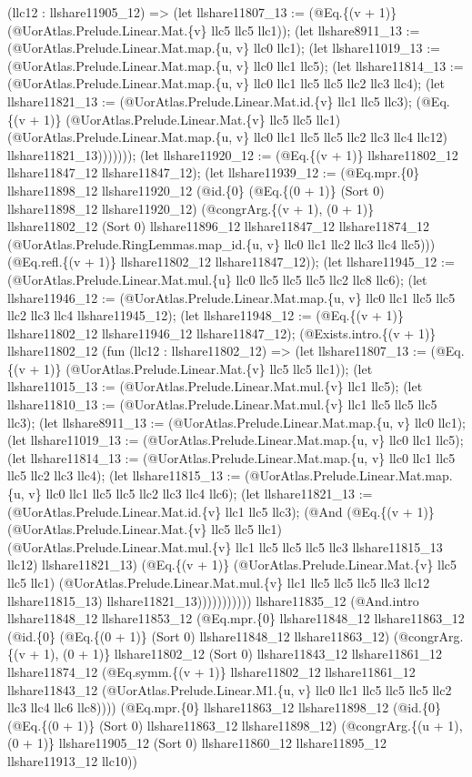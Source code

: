 \documentclass[11pt]{article}
\begin{document}
(llc12 : llshare11905\_12) => (let llshare11807\_13 := (@Eq.\{(v + 1)\} (@UorAtlas.Prelude.Linear.Mat.\{v\} llc5 llc5 llc1)); (let llshare8911\_13 := (@UorAtlas.Prelude.Linear.Mat.map.\{u, v\} llc0 llc1); (let llshare11019\_13 := (@UorAtlas.Prelude.Linear.Mat.map.\{u, v\} llc0 llc1 llc5); (let llshare11814\_13 := (@UorAtlas.Prelude.Linear.Mat.map.\{u, v\} llc0 llc1 llc5 llc5 llc2 llc3 llc4); (let llshare11821\_13 := (@UorAtlas.Prelude.Linear.Mat.id.\{v\} llc1 llc5 llc3); (@Eq.\{(v + 1)\} (@UorAtlas.Prelude.Linear.Mat.\{v\} llc5 llc5 llc1) (@UorAtlas.Prelude.Linear.Mat.map.\{u, v\} llc0 llc1 llc5 llc5 llc2 llc3 llc4 llc12) llshare11821\_13))))))); (let llshare11920\_12 := (@Eq.\{(v + 1)\} llshare11802\_12 llshare11847\_12 llshare11847\_12); (let llshare11939\_12 := (@Eq.mpr.\{0\} llshare11898\_12 llshare11920\_12 (@id.\{0\} (@Eq.\{(0 + 1)\} (Sort 0) llshare11898\_12 llshare11920\_12) (@congrArg.\{(v + 1), (0 + 1)\} llshare11802\_12 (Sort 0) llshare11896\_12 llshare11847\_12 llshare11874\_12 (@UorAtlas.Prelude.RingLemmas.map\_id.\{u, v\} llc0 llc1 llc2 llc3 llc4 llc5))) (@Eq.refl.\{(v + 1)\} llshare11802\_12 llshare11847\_12)); (let llshare11945\_12 := (@UorAtlas.Prelude.Linear.Mat.mul.\{u\} llc0 llc5 llc5 llc5 llc2 llc8 llc6); (let llshare11946\_12 := (@UorAtlas.Prelude.Linear.Mat.map.\{u, v\} llc0 llc1 llc5 llc5 llc2 llc3 llc4 llshare11945\_12); (let llshare11948\_12 := (@Eq.\{(v + 1)\} llshare11802\_12 llshare11946\_12 llshare11847\_12); (@Exists.intro.\{(v + 1)\} llshare11802\_12 (fun (llc12 : llshare11802\_12) => (let llshare11807\_13 := (@Eq.\{(v + 1)\} (@UorAtlas.Prelude.Linear.Mat.\{v\} llc5 llc5 llc1)); (let llshare11015\_13 := (@UorAtlas.Prelude.Linear.Mat.mul.\{v\} llc1 llc5); (let llshare11810\_13 := (@UorAtlas.Prelude.Linear.Mat.mul.\{v\} llc1 llc5 llc5 llc5 llc3); (let llshare8911\_13 := (@UorAtlas.Prelude.Linear.Mat.map.\{u, v\} llc0 llc1); (let llshare11019\_13 := (@UorAtlas.Prelude.Linear.Mat.map.\{u, v\} llc0 llc1 llc5); (let llshare11814\_13 := (@UorAtlas.Prelude.Linear.Mat.map.\{u, v\} llc0 llc1 llc5 llc5 llc2 llc3 llc4); (let llshare11815\_13 := (@UorAtlas.Prelude.Linear.Mat.map.\{u, v\} llc0 llc1 llc5 llc5 llc2 llc3 llc4 llc6); (let llshare11821\_13 := (@UorAtlas.Prelude.Linear.Mat.id.\{v\} llc1 llc5 llc3); (@And (@Eq.\{(v + 1)\} (@UorAtlas.Prelude.Linear.Mat.\{v\} llc5 llc5 llc1) (@UorAtlas.Prelude.Linear.Mat.mul.\{v\} llc1 llc5 llc5 llc5 llc3 llshare11815\_13 llc12) llshare11821\_13) (@Eq.\{(v + 1)\} (@UorAtlas.Prelude.Linear.Mat.\{v\} llc5 llc5 llc1) (@UorAtlas.Prelude.Linear.Mat.mul.\{v\} llc1 llc5 llc5 llc5 llc3 llc12 llshare11815\_13) llshare11821\_13))))))))))) llshare11835\_12 (@And.intro llshare11848\_12 llshare11853\_12 (@Eq.mpr.\{0\} llshare11848\_12 llshare11863\_12 (@id.\{0\} (@Eq.\{(0 + 1)\} (Sort 0) llshare11848\_12 llshare11863\_12) (@congrArg.\{(v + 1), (0 + 1)\} llshare11802\_12 (Sort 0) llshare11843\_12 llshare11861\_12 llshare11874\_12 (@Eq.symm.\{(v + 1)\} llshare11802\_12 llshare11861\_12 llshare11843\_12 (@UorAtlas.Prelude.Linear.M1.\{u, v\} llc0 llc1 llc5 llc5 llc5 llc2 llc3 llc4 llc6 llc8)))) (@Eq.mpr.\{0\} llshare11863\_12 llshare11898\_12 (@id.\{0\} (@Eq.\{(0 + 1)\} (Sort 0) llshare11863\_12 llshare11898\_12) (@congrArg.\{(u + 1), (0 + 1)\} llshare11905\_12 (Sort 0) llshare11860\_12 llshare11895\_12 llshare11913\_12 llc10)) 
\end{document}
